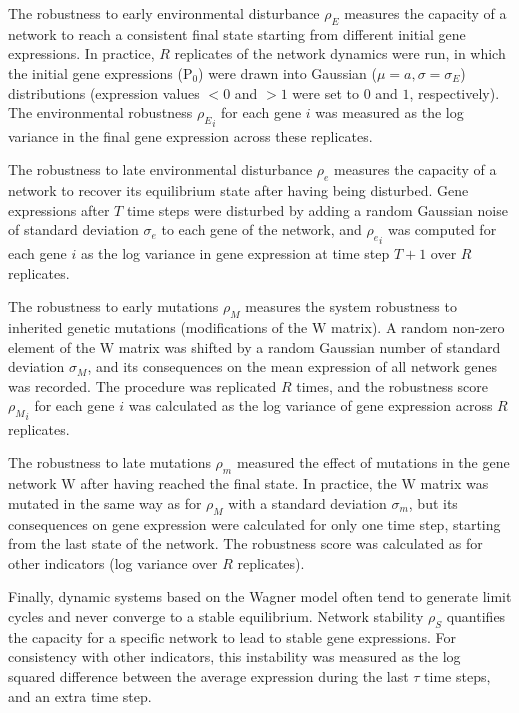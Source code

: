 \documentclass[10pt,a4paper]{article}
\newcommand{\stability}{{\rho_S}}
\newcommand{\earlyenv}{{\rho_E}}
\newcommand{\lateenv}{{\rho_e}}
\newcommand{\earlymut}{{\rho_M}}
\newcommand{\latemut}{{\rho_m}}
\newcommand{\W}{\bm{\mathrm W}}
\newcommand{\Pp}{\bm{\mathrm P}}
\begin{document}
The robustness to early environmental disturbance $\earlyenv$ measures the capacity of a network to reach a consistent final state starting from different initial gene expressions. In practice, $R$ replicates of the network dynamics were run, in which the initial gene expressions ($\Pp_0$) were drawn into Gaussian ($\mu = a, \sigma = \sigma_E$) distributions (expression values $<0$ and $>1$ were set to $0$ and $1$, respectively). The environmental robustness $\earlyenv_i$ for each gene $i$ was measured as the log variance in the final gene expression across these replicates. 

The robustness to late environmental disturbance $\lateenv$ measures the capacity of a network to recover its equilibrium state after having being disturbed. Gene expressions after $T$ time steps were disturbed by adding a random Gaussian noise of standard deviation $\sigma_e$ to each gene of the network, and $\lateenv_i$ was computed for each gene $i$ as the log variance in gene expression at time step $T+1$ over $R$ replicates. 

The robustness to early mutations $\earlymut$ measures the system robustness to inherited genetic mutations (modifications of the $\W$ matrix). A random non-zero element of the $\W$ matrix was shifted by a random Gaussian number of standard deviation $\sigma_M$, and its consequences on the mean expression of all network genes was recorded. The procedure was replicated $R$ times, and the robustness score $\earlymut_i$ for each gene $i$ was calculated as the log variance of gene expression across $R$ replicates. 

The robustness to late mutations $\latemut$ measured the effect of mutations in the gene network $\W$ after having reached the final state. In practice, the $\W$ matrix was mutated in the same way as for $\earlymut$ with a standard deviation $\sigma_m$, but its consequences on gene expression were calculated for only one time step, starting from the last state of the network. The robustness score was calculated as for other indicators (log variance over $R$ replicates).

Finally, dynamic systems based on the Wagner model often tend to generate limit cycles and never converge to a stable equilibrium. Network stability $\stability$ quantifies the capacity for a specific network to lead to stable gene expressions.  For consistency with other indicators, this instability was measured as the log squared difference between the average expression during the last $\tau$ time steps, and an extra time step. 
\end{document}
